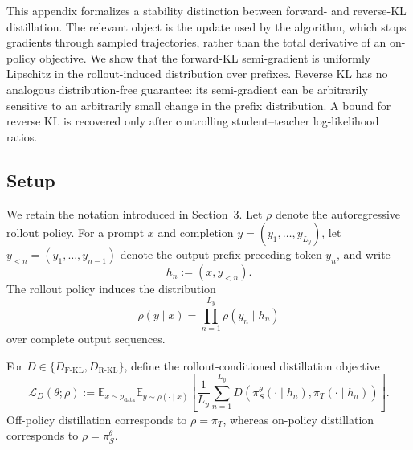 \documentclass{article} %
\theoremstyle{plain}
\theoremstyle{definition}
\theoremstyle{remark}
\begin{document}
This appendix formalizes a stability distinction between forward- and
reverse-KL distillation.  The relevant object is the update used by the
algorithm, which stops gradients through sampled trajectories, rather than the
total derivative of an on-policy objective.  We show that the forward-KL
semi-gradient is uniformly Lipschitz in the rollout-induced distribution over
prefixes.  Reverse KL has no analogous distribution-free guarantee: its
semi-gradient can be arbitrarily sensitive to an arbitrarily small change in
the prefix distribution.  A bound for reverse KL is recovered only after
controlling student--teacher log-likelihood ratios.

\subsection{Setup}
\label{app:stability-setup}

We retain the notation introduced in Section~3.  Let $\rho$ denote the
autoregressive rollout policy.  For a prompt $x$ and completion
$y=(y_1,\ldots,y_{L_y})$, let $y_{<n}=(y_1,\ldots,y_{n-1})$ denote the output
prefix preceding token $y_n$, and write
\begin{equation}
    h_n := (x,y_{<n}).
    \label{eq:prefix-notation}
\end{equation}
The rollout policy induces the distribution
\begin{equation}
    \rho(y\mid x)
    =
    \prod_{n=1}^{L_y}\rho(y_n\mid h_n)
    \label{eq:rollout-completion-distribution}
\end{equation}
over complete output sequences.

For
$D\in\{D_{\mathrm{F\text{-}KL}},D_{\mathrm{R\text{-}KL}}\}$, define the
rollout-conditioned distillation objective
\begin{equation}
    \mathcal L_D(\theta;\rho)
    :=
    \mathbb E_{x\sim p_{\mathrm{data}}}
    \mathbb E_{y\sim\rho(\cdot\mid x)}
    \left[
        \frac{1}{L_y}
        \sum_{n=1}^{L_y}
        D\left(
            \pi_S^\theta(\cdot\mid h_n),
            \pi_T(\cdot\mid h_n)
        \right)
    \right].
    \label{eq:rollout-conditioned-objective}
\end{equation}
Off-policy distillation corresponds to $\rho=\pi_T$, whereas on-policy
distillation corresponds to $\rho=\pi_S^\theta$.
\end{document}
